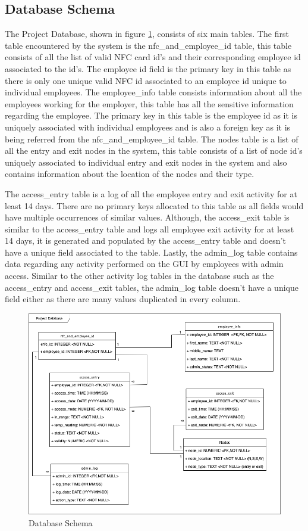 \subsection{Database Schema}

The Project Database, shown in figure \ref{fig:db-schema}, consists of six main
tables. The first table encountered by the system is the nfc\_and\_employee\_id
table, this table consists of all the list of valid NFC card id’s and their
corresponding employee id associated to the id’s. The employee id field is the
primary key in this table as there is only one unique valid NFC id associated to
an employee id unique to individual employees. The employee\_info table consists
information about all the employees working for the employer, this table has all
the sensitive information regarding the employee. The primary key in this table
is the employee id as it is uniquely associated with individual employees and is
also a foreign key as it is being referred from the nfc\_and\_employee\_id
table. The nodes table is a list of all the entry and exit nodes in the system,
this table consists of a list of node id’s uniquely associated to individual
entry and exit nodes in the system and also contains information about the
location of the nodes and their type. 

The access\_entry table is a log of all the employee entry and exit activity for
at least 14 days. There are no primary keys allocated to this table as all
fields would have multiple occurrences of similar values. Although, the
access\_exit table is similar to the access\_entry table and logs all employee
exit activity for at least 14 days, it is generated and populated by the
access\_entry table and doesn’t have a unique field associated to the table.
Lastly, the admin\_log table contains data regarding any activity performed on
the GUI by employees with admin access. Similar to the other activity log tables
in the database such as the access\_entry and access\_exit tables, the
admin\_log table doesn’t have a unique field either as there are many values
duplicated in every column. 

\begin{figure}[!htb]
\centering
\includegraphics[width=\textwidth]{images/db-schema.png}
\caption{Database Schema}
\label{fig:db-schema}
\end{figure}

